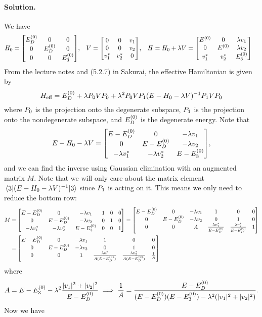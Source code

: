 \documentclass[11pt]{article}
\newcommand{\beq}{\begin{equation*}}
\newcommand{\eeq}{\end{equation*}}
\newcommand{\beqn}{\begin{equation}}
\newcommand{\eeqn}{\end{equation}}
\newenvironment{solution}
{
    \paragraph{Solution.}
    \ignorespaces
}
{
}
\begin{document}
\begin{solution}
	We have
	\begin{align*}
		\Ho &= \mqty[ \Eod & 0 & 0 \\ 0 & \Eod & 0 \\ 0 & 0 & \Eoe ], &
		V &= \mqty[ 0 & 0 & \vq \\ 0 & 0 & \vw \\ \vqs & \vws & 0 ], &
		H &= \Ho + \lam V = \mqty[ \Eo & 0 & \lam \vq \\ 0 & \Eo & \lam \vw \\ \vqs & \vws & \Eoe] 
	\end{align*}
	From the lecture notes and (5.2.7) in Sakurai, the effective Hamiltonian is given by
	\beq
		\Heff = \Eod + \lam \Po V \Po + \lam^2 \Po V \Pq (E - \Ho - \lam V)^{-1} \Pq V \Po
	\eeq
	where $P_0$ is the projection onto the degenerate subspace, $P_1$ is the projection onto the nondegenerate subspace, and $E^{(0)}_D$ is the degenerate energy.  Note that
	\beq
		E - \Ho - \lam V = \mqty[ E - \Eod & 0 & -\lam \vq \\ 0 & E - \Eod & -\lam \vw \\ -\lam \vqs & -\lam \vws & E - \Eoe ],
	\eeq
	and we can find the inverse using Gaussian elimination with an augmented matrix $M$.  Note that we will only care about the matrix element $\mel{3}{(E - H_0- \lambda V)^{-1}}{3}$ since $P_1$ is acting on it.  This means we only need to reduce the bottom row:
	\begin{align*}
		M &= \mqty[ E - \Eod & 0 & -\lam \vq & 1 & 0 & 0 \\ 0 & E - \Eod & -\lam \vw & 0 & 1 & 0 \\ -\lam \vqs & -\lam \vws & E - \Eoe & 0 & 0 & 1 ]
		= \mqty[ E - \Eod & 0 & -\lam \vq & 1 & 0 & 0 \\ 0 & E - \Eod & -\lam \vw & 0 & 1 & 0 \\ 0 & 0 & A & \frac{\lam \vqs}{E - \Eod} & \frac{\lam \vws}{E - \Eod} & 1 ] \\
		&= \mqty[ E - \Eod & 0 & -\lam \vq & 1 & 0 & 0 \\ 0 & E - \Eod & -\lam \vw & 0 & 1 & 0 \\ 0 & 0 & 1 & \frac{\lam \vqs}{A (E - \Eod)} & \frac{\lam \vws}{A (E - \Eod)} & \frac{1}{A} ]
	\end{align*}
	where
	\beqn \label{A}
		A = E - \Eoe - \lam^2 \frac{|\vq|^2 + |\vw|^2}{E - \Eod}
		\implies \frac{1}{A} = \frac{E - \Eod}{(E - \Eod) (E - \Eoe) - \lam^2 (|\vq|^2 + |\vw|^2)}.
	\eeqn
	Now we have
	\begin{align*}

\end{align*}
\end{solution}
\end{document}

